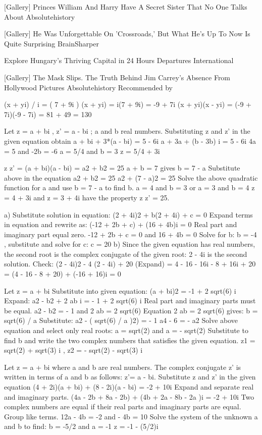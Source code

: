 [Gallery] Princes William And Harry Have A Secret Sister That No One Talks About
Absolutehistory


[Gallery] He Was Unforgettable On 'Crossroads,' But What He's Up To Now Is Quite Surprising
BrainSharper


Explore Hungary's Thriving Capital in 24 Hours
Departures International


[Gallery] The Mask Slips. The Truth Behind Jim Carrey's Absence From Hollywood Pictures
Absolutehistory
Recommended by 


(x + yi) / i = ( 7 + 9i ) 
(x + yi) = i(7 + 9i) = -9 + 7i 
(x + yi)(x - yi) = (-9 + 7i)(-9 - 7i) = 81 + 49 = 130 

Let z = a + bi , z' = a - bi ; a and b real numbers. 
Substituting z and z' in the given equation obtain 
a + bi + 3*(a - bi) = 5 - 6i 
a + 3a + (b - 3b) i = 5 - 6i 
4a = 5 and -2b = -6 
a = 5/4 and b = 3 
z = 5/4 + 3i 

z z' = (a + bi)(a - bi) 
= a2 + b2 = 25 
a + b = 7 gives b = 7 - a 
Substitute above in the equation a2 + b2 = 25 
a2 + (7 - a)2 = 25 
Solve the above quadratic function for a and use b = 7 - a to find b. 
a = 4 and b = 3 or a = 3 and b = 4 
z = 4 + 3i and z = 3 + 4i have the property z z' = 25. 

a) Substitute solution in equation: (2 + 4i)2 + b(2 + 4i) + c = 0 
Expand terms in equation and rewrite as: (-12 + 2b + c) + (16 + 4b)i = 0 
Real part and imaginary part equal zero. 
-12 + 2b + c = 0 and 16 + 4b = 0 
Solve for b: b = -4 , substitute and solve for c: c = 20 
b) Since the given equation has real numbers, the second root is the complex conjugate of the given root: 2 - 4i is the second solution. 
Check: (2 - 4i)2 - 4 (2 - 4i) + 20 
(Expand) = 4 - 16 - 16i - 8 + 16i + 20 
= (4 - 16 - 8 + 20) + (-16 + 16)i = 0 
 
Let z = a + bi 
Substitute into given equation: (a + bi)2 = -1 + 2 sqrt(6) i 
Expand: a2 - b2 + 2 ab i = - 1 + 2 sqrt(6) i 
Real part and imaginary parts must be equal. 
a2 - b2 = - 1 and 2 ab = 2 sqrt(6) 
Equation 2 ab = 2 sqrt(6) gives: b = sqrt(6) / a 
Substitute: a2 - ( sqrt(6) / a )2) = - 1 
a4 - 6 = - a2
Solve above equation and select only real roots: a = sqrt(2) and a = - sqrt(2) 
Substitute to find b and write the two complex numbers that satisfies the given equation. 
z1 = sqrt(2) + sqrt(3) i , z2 = - sqrt(2) - sqrt(3) i 

Let z = a + bi where a and b are real numbers. The complex conjugate z' is written in terms of a and b as follows: z'= a - bi. Substitute z and z' in the given equation 
(4 + 2i)(a + bi) + (8 - 2i)(a - bi) = -2 + 10i 
Expand and separate real and imaginary parts. 
(4a - 2b + 8a - 2b) + (4b + 2a - 8b - 2a )i = -2 + 10i 
Two complex numbers are equal if their real parts and imaginary parts are equal. Group like terms. 
12a - 4b = -2 and - 4b = 10 
Solve the system of the unknown a and b to find: 
b = -5/2 and a = -1 
z = -1 - (5/2)i 

